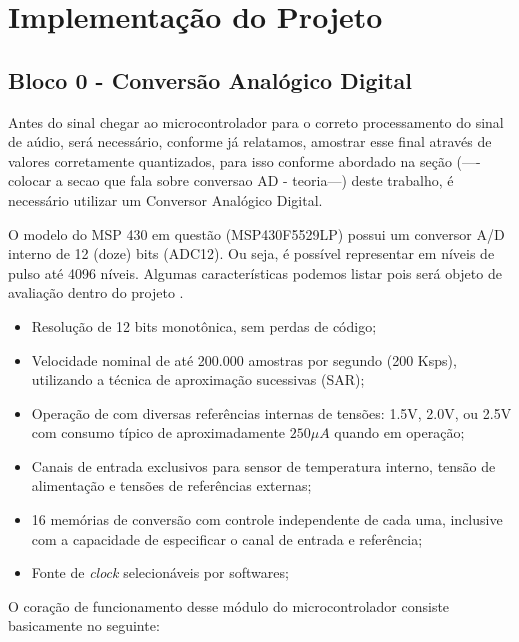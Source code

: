 \chapter{Implementação do Projeto}

\section{Bloco 0 - Conversão Analógico Digital}
	
	Antes do sinal chegar ao microcontrolador para o correto processamento do sinal de aúdio, será necessário, conforme já relatamos, amostrar esse final através de valores corretamente quantizados, para isso conforme abordado na seção (----colocar a secao que fala sobre conversao AD - teoria---) deste trabalho, é necessário utilizar um Conversor Analógico Digital.
	
	O modelo do MSP 430 em questão (MSP430F5529LP) possui um conversor A/D interno de 12 (doze) bits (ADC12). Ou seja, é possível representar em níveis de pulso até 4096 níveis. Algumas características podemos listar pois será objeto de avaliação dentro do projeto \cite{Davies2008}.
	
	\begin{itemize}
		\item Resolução de 12 bits monotônica, sem perdas de código;
		\item Velocidade nominal de até 200.000 amostras por segundo (200 Ksps), utilizando a técnica de aproximação sucessivas (SAR);
		\item Operação de com diversas referências internas de tensões: 1.5V, 2.0V, ou 2.5V com consumo típico de aproximadamente $250\mu A$ quando em operação;
		\item Canais de entrada exclusivos para sensor de temperatura interno, tensão de alimentação e tensões de referências externas;
		\item 16 memórias de conversão com controle independente de cada uma, inclusive com a capacidade de especificar o canal de entrada e referência;
		\item Fonte de \textit{clock} selecionáveis por softwares;
	\end{itemize}

	O coração de funcionamento desse módulo do microcontrolador consiste basicamente no seguinte:
	
